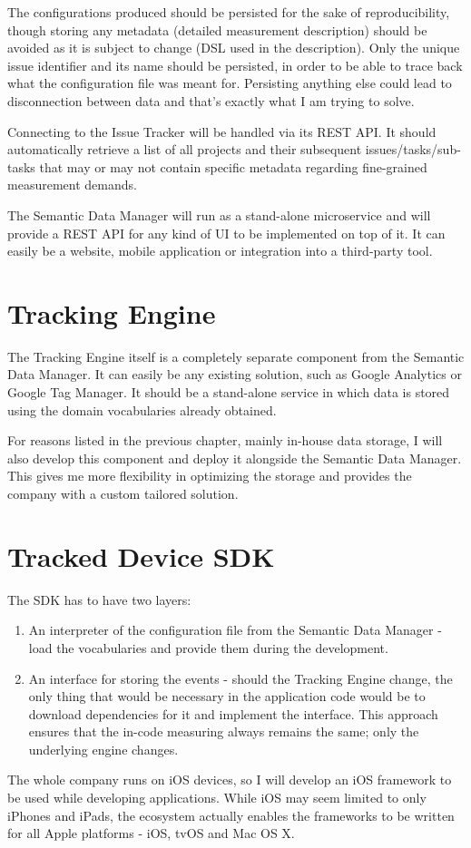 The configurations produced should be persisted for the sake of reproducibility, though storing any metadata (detailed measurement description) should be avoided as it is subject to change (DSL used in the description). Only the unique issue identifier and its name should be persisted, in order to be able to trace back what the configuration file was meant for. Persisting anything else could lead to disconnection between data and that's exactly what I am trying to solve.

Connecting to the Issue Tracker will be handled via its REST API. It should automatically retrieve a list of all projects and their subsequent issues/tasks/sub-tasks that may or may not contain specific metadata regarding fine-grained measurement demands.

The Semantic Data Manager will run as a stand-alone microservice and will provide a REST API for any kind of UI to be implemented on top of it. It can easily be a website, mobile application or integration into a third-party tool.

\section{Tracking Engine}

The Tracking Engine itself is a completely separate component from the Semantic Data Manager. It can easily be any existing solution, such as Google Analytics or Google Tag Manager. It should be a stand-alone service in which data is stored using the domain vocabularies already obtained.

For reasons listed in the previous chapter, mainly in-house data storage, I will also develop this component and deploy it alongside the Semantic Data Manager. This gives me more flexibility in optimizing the storage and provides the company with a custom tailored solution.

\section{Tracked Device SDK}

The SDK has to have two layers:

\begin{enumerate}
	\item An interpreter of the configuration file from the Semantic Data Manager - load the vocabularies and provide them during the development.
	\item An interface for storing the events - should the Tracking Engine change, the only thing that would be necessary in the application code would be to download dependencies for it and implement the interface. This approach ensures that the in-code measuring always remains the same; only the underlying engine changes.
\end{enumerate}

The whole company runs on iOS devices, so I will develop an iOS framework to be used while developing applications. While iOS may seem limited to only iPhones and iPads, the ecosystem actually enables the frameworks to be written for all Apple platforms - iOS, tvOS and Mac OS X.
